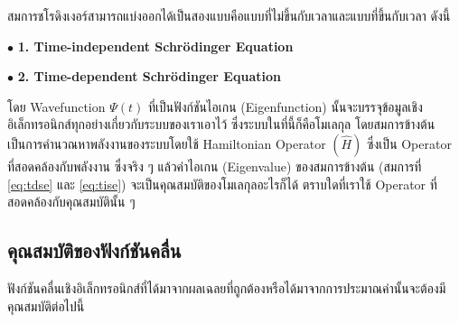 สมการชโรดิงเงอร์สามารถแบ่งออกได้เป็นสองแบบคือแบบที่ไม่ขึ้นกับเวลาและแบบที่ขึ้นกับเวลา ดังนี้

\noindent $\bullet$ \textbf{1. Time-independent Schr\"{o}dinger Equation}


\noindent $\bullet$ \textbf{2. Time-dependent Schr\"{o}dinger Equation}


โดย Wavefunction $\Psi(t)$ ที่เป็นฟังก์ชันไอเกน (Eigenfunction) นั้นจะบรรจุข้อมูลเชิงอิเล็กทรอนิกส์ทุกอย่างเกี่ยวกับระบบของเราเอาไว้%
\autocite{szabo1996,cramer2004,jensen2017} ซึ่งระบบในที่นี้ก็คือโมเลกุล โดยสมการข้างต้นเป็นการคำนวณหาพลังงานของระบบโดยใช้ 
Hamiltonian Operator $(\hat{H})$ ซึ่งเป็น Operator ที่สอดคล้องกับพลังงาน ซึ่งจริง ๆ แล้วค่าไอเกน (Eigenvalue) ของสมการข้างต้น 
(สมการที่ \ref{eq:tdse} และ \ref{eq:tise}) จะเป็นคุณสมบัติของโมเลกุลอะไรก็ได้ ตราบใดที่เราใช้ Operator ที่สอดคล้องกับคุณสมบัตินั้น ๆ 

\subsection{คุณสมบัติของฟังก์ชันคลื่น}
\label{ssec:wavefunc_prop}

ฟังก์ชันคลื่นเชิงอิเล็กทรอนิกส์ที่ได้มาจากผลเฉลยที่ถูกต้องหรือได้มาจากการประมาณค่านั้นจะต้องมีคุณสมบัติต่อไปนี้ 

